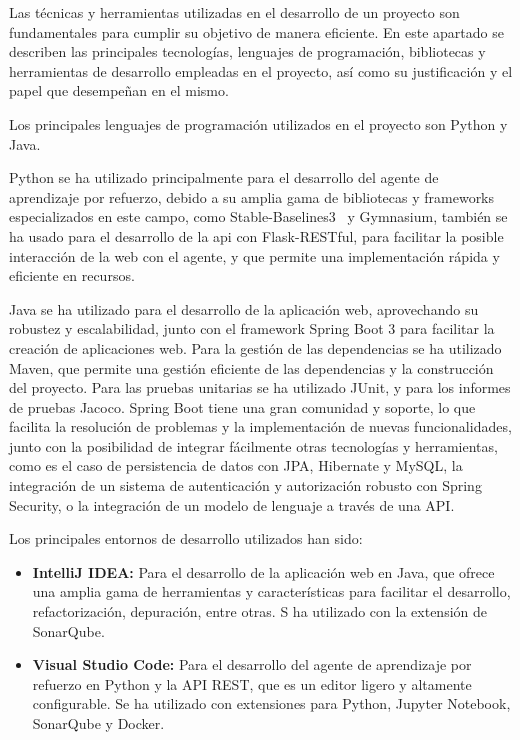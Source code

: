 Las técnicas y herramientas utilizadas en el desarrollo de un proyecto son fundamentales para cumplir su objetivo de manera eficiente. En este apartado se describen las principales tecnologías, lenguajes de programación, bibliotecas y herramientas de desarrollo empleadas en el proyecto, así como su justificación y el papel que desempeñan en el mismo.

Los principales lenguajes de programación utilizados en el proyecto son Python y Java.

Python se ha utilizado principalmente para el desarrollo del agente de aprendizaje por refuerzo, debido a su amplia gama de bibliotecas y frameworks especializados en este campo, como Stable-Baselines3~\cite{Raffin2021} y Gymnasium, también se ha usado para el desarrollo de la api con Flask-RESTful, para facilitar la posible interacción de la web con el agente, y que permite una implementación rápida y eficiente en recursos.

Java se ha utilizado para el desarrollo de la aplicación web, aprovechando su robustez y escalabilidad, junto con el framework Spring Boot 3 para facilitar la creación de aplicaciones web. Para la gestión de las dependencias se ha utilizado Maven, que permite una gestión eficiente de las dependencias y la construcción del proyecto. Para las pruebas unitarias se ha utilizado JUnit, y para los informes de pruebas Jacoco. Spring Boot tiene una gran comunidad y soporte, lo que facilita la resolución de problemas y la implementación de nuevas funcionalidades, junto con la posibilidad de integrar fácilmente otras tecnologías y herramientas, como es el caso de persistencia de datos con JPA, Hibernate y MySQL, la integración de un sistema de autenticación y autorización robusto con Spring Security, o la integración de un modelo de lenguaje a través de una API.

Los principales entornos de desarrollo utilizados han sido:
\begin{itemize}
    \item \textbf{IntelliJ IDEA:} Para el desarrollo de la aplicación web en Java, que ofrece una amplia gama de herramientas y características para facilitar el desarrollo, refactorización, depuración, entre otras. S ha utilizado con la extensión de SonarQube.
    \item \textbf{Visual Studio Code:} Para el desarrollo del agente de aprendizaje por refuerzo en Python y la API REST, que es un editor ligero y altamente configurable. Se ha utilizado con extensiones para Python, Jupyter Notebook, SonarQube y Docker.
\end{itemize}

